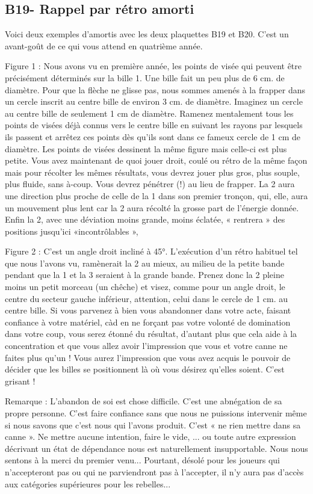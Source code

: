 \subsection{B19- Rappel par rétro
amorti}\label{b19--rappel-par-ruxe9tro-amorti}

Voici deux exemples d'amortis avec les deux plaquettes B19 et B20. C'est
un avant-goût de ce qui vous attend en quatrième année.

Figure 1 : Nous avons vu en première année, les points de visée qui
peuvent être précisément déterminés sur la bille 1. Une bille fait un
peu plus de 6 cm. de diamètre. Pour que la flèche ne glisse pas, nous
sommes amenés à la frapper dans un cercle inscrit au centre bille de
environ 3 cm. de diamètre. Imaginez un cercle au centre bille de
seulement 1 cm de diamètre. Ramenez mentalement tous les points de
visées déjà connus vers le centre bille en suivant les rayons par
lesquels ils passent et arrêtez ces points dès qu'ils sont dans ce
fameux cercle de 1 cm de diamètre. Les points de visées dessinent la
même figure mais celle-ci est plus petite. Vous avez maintenant de quoi
jouer droit, coulé ou rétro de la même façon mais pour récolter les
mêmes résultats, vous devrez jouer plus gros, plus souple, plus fluide,
sans à-coup. Vous devrez pénétrer (!) au lieu de frapper. La 2 aura une
direction plus proche de celle de la 1 dans son premier tronçon, qui,
elle, aura un mouvement plus lent car la 2 aura récolté la grosse part
de l'énergie donnée. Enfin la 2, avec une déviation moins grande, moins
éclatée, « rentrera » des positions jusqu'ici «incontrôlables »,

Figure 2 : C'est un angle droit incliné à 45°. L'exécution d'un rétro
habituel tel que nous l'avons vu, ramènerait la 2 au mieux, au milieu de
la petite bande pendant que la 1 et la 3 seraient à la grande bande.
Prenez donc la 2 pleine moins un petit morceau (un chêche) et visez,
comme pour un angle droit, le centre du secteur gauche inférieur,
attention, celui dans le cercle de 1 cm. au centre bille. Si vous
parvenez à bien vous abandonner dans votre acte, faisant confiance à
votre matériel, càd en ne forçant pas votre volonté de domination dans
votre coup, vous serez étonné du résultat, d'autant plus que cela aide à
la concentration et que vous allez avoir l'impression que vous et votre
canne ne faites plus qu'un ! Vous aurez l'impression que vous avez
acquis le pouvoir de décider que les billes se positionnent là où vous
désirez qu'elles soient. C'est grisant !

Remarque : L'abandon de soi est chose difficile. C'est une abnégation de
sa propre personne. C'est faire confiance sans que nous ne puissions
intervenir même si nous savons que c'est nous qui l'avons produit. C'est
« ne rien mettre dans sa canne ». Ne mettre aucune intention, faire le
vide, ... ou toute autre expression décrivant un état de dépendance nous
est naturellement insupportable. Nous nous sentons à la merci du premier
venu... Pourtant, désolé pour les joueurs qui n'accepteront pas ou qui
ne parviendront pas à l'accepter, il n'y aura pas d'accès aux catégories
supérieures pour les rebelles...

